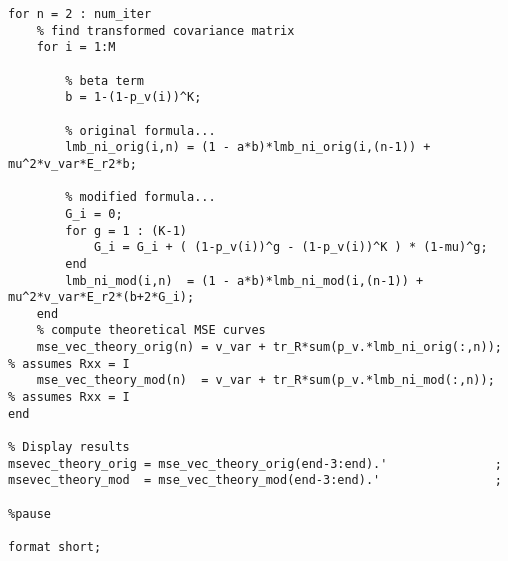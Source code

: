 \begin{lstlisting}
for n = 2 : num_iter
    % find transformed covariance matrix
    for i = 1:M

        % beta term
        b = 1-(1-p_v(i))^K;

        % original formula...
        lmb_ni_orig(i,n) = (1 - a*b)*lmb_ni_orig(i,(n-1)) + mu^2*v_var*E_r2*b;

        % modified formula...
        G_i = 0;
        for g = 1 : (K-1)
            G_i = G_i + ( (1-p_v(i))^g - (1-p_v(i))^K ) * (1-mu)^g;
        end
        lmb_ni_mod(i,n)  = (1 - a*b)*lmb_ni_mod(i,(n-1)) + mu^2*v_var*E_r2*(b+2*G_i);
    end
    % compute theoretical MSE curves
    mse_vec_theory_orig(n) = v_var + tr_R*sum(p_v.*lmb_ni_orig(:,n));     % assumes Rxx = I
    mse_vec_theory_mod(n)  = v_var + tr_R*sum(p_v.*lmb_ni_mod(:,n));      % assumes Rxx = I
end

% Display results
msevec_theory_orig = mse_vec_theory_orig(end-3:end).'               ;
msevec_theory_mod  = mse_vec_theory_mod(end-3:end).'                ;

%pause

format short;

\end{lstlisting}



